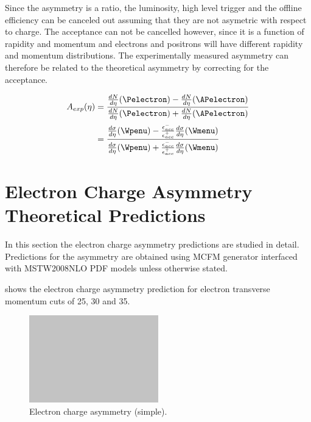 Since the asymmetry is a ratio, the luminosity, high level trigger and the
offline efficiency can be canceled out assuming that they are not asymetric
with respect to charge.\cite{me} The acceptance can not be cancelled
however, since it is a function of rapidity and momentum and electrons and
positrons will have different rapidity and momentum distributions. The
experimentally measured asymmetry can therefore be related to the theoretical
asymmetry by correcting for the acceptance.\cite{me}

\begin{align} 
A_{exp}(\eta) &= \frac{ \frac{dN}{d\eta}(\Pelectron) -
\frac{dN}{d\eta}(\APelectron) }{ \frac{dN}{d\eta}(\Pelectron) +
\frac{dN}{d\eta}(\APelectron) }\\   
              &= \frac{ \frac{d\sigma}{d\eta}(\Wpenu) -
\frac{\epsilon^{-}_{acc}}{\epsilon^{+}_{acc}} \frac{d\sigma}{d\eta}(\Wmenu) }{
\frac{d\sigma}{d\eta}(\Wpenu) + \frac{\epsilon^{-}_{acc}}{\epsilon^{+}_{acc}}
\frac{d\sigma}{d\eta}(\Wmenu) }
\label{eq:AsymExpCorr}
\end{align}



\section{Electron Charge Asymmetry Theoretical Predictions}

In this section the electron charge asymmetry predictions are studied in detail.
Predictions for the asymmetry are obtained using MCFM \cite{test} generator
interfaced with MSTW2008NLO PDF models unless otherwise stated.

 shows the electron charge asymmetry prediction for
electron transverse momentum cuts of 25, 30 and \unit{35}{\GeV}.


\begin{figure}[htb]
  \centering
  \includegraphics[width=0.5\textwidth]{placeholder}
  \caption{Electron charge asymmetry (simple).}
  \label{wbos:asym_simple}
\end{figure}


